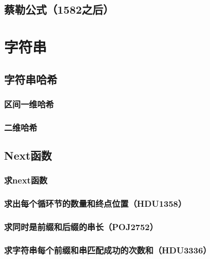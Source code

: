 \documentclass[twoside,a4paper]{article}
\begin{document}
\subsection{蔡勒公式（1582之后）}


\section{字符串}

\subsection{字符串哈希}
\subsubsection{区间一维哈希}

\subsubsection{二维哈希}




\subsection{Next函数}

\subsubsection{求next函数}


\subsubsection{求出每个循环节的数量和终点位置（HDU1358）}


\subsubsection{求同时是前缀和后缀的串长（POJ2752）}


\subsubsection{求字符串每个前缀和串匹配成功的次数和（HDU3336）}

\end{document}
